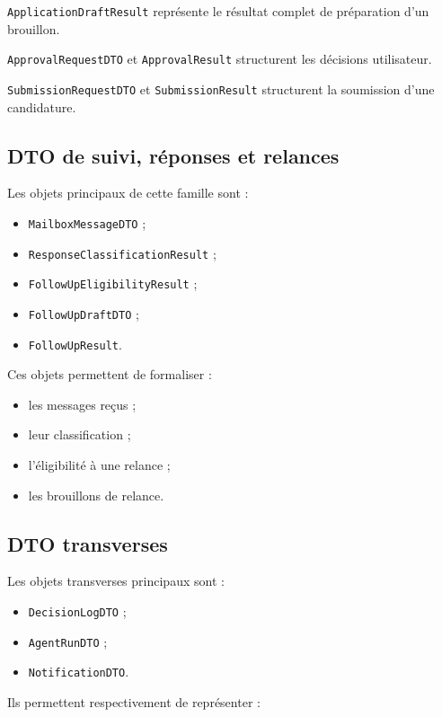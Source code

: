 \documentclass[11pt,a4paper]{article}
\begin{document}
\texttt{ApplicationDraftResult} représente le résultat complet de préparation d’un brouillon.

\texttt{ApprovalRequestDTO} et \texttt{ApprovalResult} structurent les décisions utilisateur.

\texttt{SubmissionRequestDTO} et \texttt{SubmissionResult} structurent la soumission d’une candidature.

\subsection{DTO de suivi, réponses et relances}

Les objets principaux de cette famille sont :

\begin{itemize}
    \item \texttt{MailboxMessageDTO} ;
    \item \texttt{ResponseClassificationResult} ;
    \item \texttt{FollowUpEligibilityResult} ;
    \item \texttt{FollowUpDraftDTO} ;
    \item \texttt{FollowUpResult}.
\end{itemize}

Ces objets permettent de formaliser :

\begin{itemize}
    \item les messages reçus ;
    \item leur classification ;
    \item l’éligibilité à une relance ;
    \item les brouillons de relance.
\end{itemize}

\subsection{DTO transverses}

Les objets transverses principaux sont :

\begin{itemize}
    \item \texttt{DecisionLogDTO} ;
    \item \texttt{AgentRunDTO} ;
    \item \texttt{NotificationDTO}.
\end{itemize}

Ils permettent respectivement de représenter :
\end{document}
